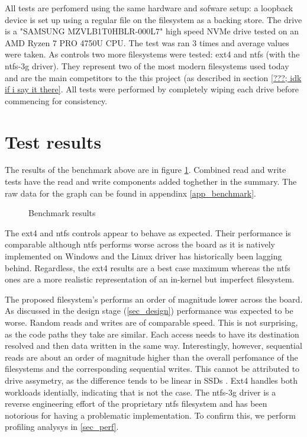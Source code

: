         All tests are perfomerd using the same hardware and sofware setup: a
        loopback device is set up using a regular file on the filesystem as a
        backing store. The drive is a "SAMSUNG MZVLB1T0HBLR-000L7" high speed
        NVMe drive tested on an AMD Ryzen 7 PRO 4750U CPU. The test was ran 3
        times and average values were taken. As controls two more filesystems
        were tested: ext4 and ntfs (with the ntfs-3g driver). They represent
        two of the most modern filesystems used today and are the main
        competitors to the this project (as described in section \ref{???; idk
        if i say it there}. All tests were performed by completely wiping each
        drive before commencing for consistency.

    \section{Test results}

        The results of the benchmark above are in figure \ref{fig_benchmark}.
        Combined read and write tests have the read and write components added
        toghether in the summary. The raw data for the graph can be found in
        appendinx \ref{app_benchmark}.

        \begin{figure}[h!]
            \caption{Benchmark results}
            
            \label{fig_benchmark}
        \end{figure}

        The ext4 and ntfs controls appear to behave as expected. Their
        performance is comparable although ntfs performs worse across the board
        as it is natively implemented on Windows and the Linux driver has
        historically been lagging behind. Regardless, the ext4 results are a
        best case maximum whereas the ntfs ones are a more realistic
        representation of an in-kernel but imperfect filesystem.

        The proposed filesystem's performs an order of magnitude lower across
        the board. As discussed in the design stage (\ref{sec_design})
        performance was expected to be worse. Random reads and writes are of
        comparable speed. This is not surprising, as the code paths they take
        are similar. Each access needs to have its destination resolved and
        then data written in the same way. Interestingly, however, sequential
        reads are about an order of magnitude higher than the overall
        perfomance of the filesystems and the corresponding sequential writes.
        This cannot be attributed to drive assymetry, as the difference tends
        to be linear in SSDs \cite{servethehome_review}. Ext4 handles both
        workloads identially, indicating that is not the case. The ntfs-3g
        driver is a reverse engineering effort of the proprietary ntfs
        filesystem and has been notorious for having a problematic
        implementation. To confirm this, we perform profiling analysys in
        \ref{sec_perf}.

